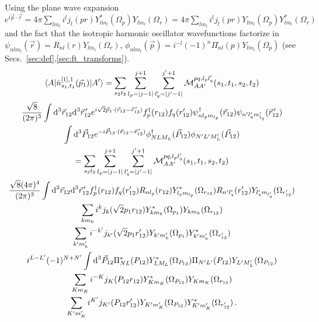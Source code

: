 \documentclass[10pt]{article}
\begin{document}
Using the plane wave expansion $e^{i \vec{p} \cdot \vec{r}} = 4 \pi \sum_{l 
m_l} i^{l} j_{l}(p r) Y_{l m_l}^{*}(\Omega_{p}) Y_{l m_l}(\Omega_{r}) = 4 \pi 
\sum_{l m_l} i^{l} j_{l}(p r) Y_{l m_l}(\Omega_{p}) Y_{l m_l}^{*}(\Omega_{r})$ 
and the fact that the isotropic harmonic oscillator wavefunctions factorize in 
$\psi_{n l m_l}(\vec{r}) = R_{n l}(r) Y_{l m_l}(\Omega_{r})$, $\phi_{n l 
m_l}(\vec{p}) = i^{-l}(-1)^{n} \Pi_{n l}(p) Y_{l m_l}(\Omega_{p})$ (see 
Secs.~\ref{sec:def},\ref{sec:ft_transforms}).
\begin{multline*}
	\braket{ A | \hat{n}_{s_1,t_1}^{[1],1}(\vec{p}_1) | A'} = \sum_{s_2 t_2} 
 \sum_{l_p = |j-1|}^{j+1} \sum_{l_q' = |j' - 1|}^{j'+1} \mathcal{M}_{AA'}^{p 
q,l_p l_q'}(s_1,t_1,s_2,t_2) \\
    \frac{\sqrt{8}}{(2 \pi)^{3}} \int \text{d}^{3} \vec{r}_{12} \text{d}^{3} 
\vec{r}_{12}^{\, \prime}  e^{ i \sqrt{2} \vec{p}_{1} \cdot ( \vec{r}_{12} - 
\vec{r}_{12}^{\, \prime}) } f_{p}^{\dagger}(r_{12}) f_{q}(r_{12}')  \psi_{ n l_p 
m_{l_p}}^{\dagger}(\vec{r}_{12}) \psi_{ n' l_q' m_{l_q}' }(\vec{r}_{12}^{\, 
\prime}) \\
   \int \text{d}^{3} \vec{P}_{12} e^{ -i \vec{P}_{12} \cdot (\vec{r}_{12} - 
\vec{r}_{12}^{\, \prime})} \phi_{N L M_L}^{\dagger}(\vec{P}_{12}) \phi_{N' L' 
M_L'}(\vec{P}_{12})  \\
   = \sum_{s_2 t_2}  \sum_{l_p = |j-1|}^{j+1} \sum_{l_q' = |j' - 1|}^{j'+1} 
\mathcal{M}_{AA'}^{p q,l_p l_q'}(s_1,t_1,s_2,t_2) \\
    \frac{\sqrt{8} (4 \pi)^{4}}{(2 \pi)^{3}} \int \text{d}^{3} \vec{r}_{12} 
\text{d}^{3} \vec{r}_{12}^{\, \prime} f_{p}^{\dagger}(r_{12}) f_{q}(r_{12}')  
R_{n l_p}(r_{12}) Y_{l_p m_{l_p}}^{*}(\Omega_{r_{12}}) R_{n' l_q'}(r_{12}') 
Y_{l_q' m_{l_q'}}(\Omega_{r_{12}'}) \\
   \sum_{k m_k} i^{k} j_{k}( \sqrt{2} p_1 r_{12}) Y_{k m_k}^{*}(\Omega_{p_1}) 
Y_{k m_k}(\Omega_{r_{12}}) \\
   \sum_{k' m_k'} i^{-k'} j_{k'}( \sqrt{2} p_1 r_{12}') Y_{k' 
m_k'}(\Omega_{p_1}) Y_{k' m_k'}^{*}(\Omega_{r_{12}'}) \\
   i^{L-L'} (-1)^{N+N'}
   \int \text{d}^{3} \vec{P}_{12} \Pi_{N L}^{*}(P_{12}) Y_{L 
M_L}^{*}(\Omega_{P_{12}}) \Pi_{N' L'}(P_{12}) Y_{L' M_L'}(\Omega_{P_{12}})   \\
   \sum_{K m_K} i^{-K} j_{K}(P_{12} r_{12}) Y_{K m_K}^{*}(\Omega_{P_{12}}) Y_{K m_K}(\Omega_{r_{12}}) \\
   \sum_{K' m_K'} i^{K'} j_{K'}(P_{12} r_{12}') Y_{K' m_K'}(\Omega_{P_{12}}) Y_{K' m_K'}^{*}(\Omega_{r_{12}'}) \, . \\
\end{multline*}
\end{document}
